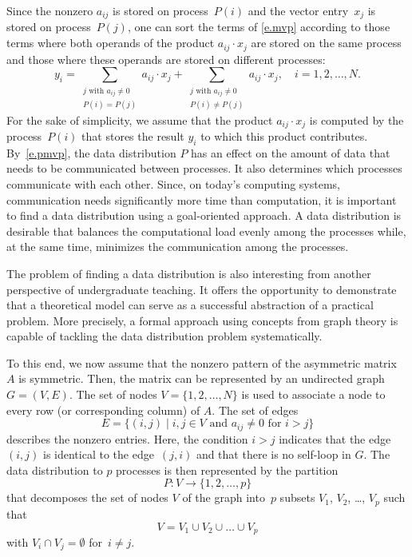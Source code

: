 \documentclass[12pt, oneside]{book}
\newcommand{\mat}[1]{\ensuremath{#1}}
\begin{document}
Since the nonzero $a_{ij}$ is stored on process~$P(i)$ and the vector entry~$x_j$ is
stored on process~$P(j)$, one can sort the terms of \eqref{e.mvp} according to
those terms where both operands of the product $a_{ij} \cdot x_j$ are stored on the same
process and those where these operands are stored on different processes:
\begin{equation}
\label{e.pmvp}
y_i =
  \sum_{ \substack{j  \text{ with }  a_{ij} \neq 0\\ P(i)=P(j)}} a_{ij} \cdot x_j
+ \sum_{ \substack{j  \text{ with }  a_{ij} \neq 0\\ P(i)\neq P(j)}} a_{ij} \cdot x_j ,
\quad i = 1, 2, \dots, N.
\end{equation}
For the sake of simplicity, we assume that the product $a_{ij} \cdot x_j$ is computed by
the process~$P(i)$ that stores the result $y_i$ to which this product contributes.
By~\eqref{e.pmvp}, the data distribution  $P$ has an effect on the amount of data that
needs to be communicated between processes. It also determines which processes
communicate with each other. Since, on today's computing systems, communication needs
significantly more time than computation, it is important to find a data distribution
using a goal-oriented approach. A data distribution is desirable that balances the
computational load evenly among the processes while, at the same time, minimizes the
communication among the processes.

The problem of finding a data distribution is also interesting from another perspective
of undergraduate teaching. It offers the opportunity to demonstrate that a theoretical
model can serve as a successful abstraction of a practical problem. More precisely, a
formal approach using concepts from graph theory is capable of tackling the data
distribution problem systematically.

To this end, we now assume that the nonzero pattern of the asymmetric matrix \mat{A} is
symmetric. Then, the matrix can be represented by an undirected graph $G=(V,E)$. The set
of nodes $V = \{ 1, 2, \dots, N\}$ is used to associate a node to every row (or
corresponding column) of \mat{A}. The set of edges
\begin{displaymath}
E = \{ (i,j) \mid i, j \in V \text{ and } a_{ij} \neq 0 \text{ for }  i > j \}
\end{displaymath}
describes the nonzero entries. Here, the condition $i>j$ indicates that the edge~$(i,j)$
is identical to the edge~$(j,i)$ and that there is no self-loop in $G$. The data
distribution to $p$ processes is then represented by the partition
$$
P:  V \rightarrow \{1, 2, \dots, p\}
$$
that decomposes the set of nodes $V$ of the graph into~$p$ subsets $V_1$, $V_2$, \dots,
$V_p$ such that
$$
V = V_1 \cup V_2 \cup \dots \cup V_p
$$
with $V_i \cap V_j = \emptyset$ for~$i \neq j$.
\end{document}
